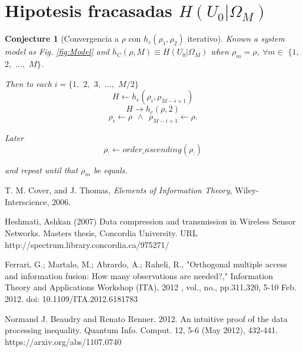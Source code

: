 \documentclass[a4paper,10pt]{article}
\newtheorem{conjecture}[mytheorem]{Conjecture}
\begin{document}
\section{Hipotesis fracasadas $H(U_0|\Omega_M)$ }
\label{subsec:h0OmegaM_2}


\begin{mdframed}[style=MDFStyGrayScreen]
\begin{conjecture}[Convergencia a $\rho$ con $h_c(\rho_1,\rho_2)$ iterativo]
 \label{lemm:h0OmegaM_hc2}
 Known a system model as Fig. \ref{fig:Model} and $h_{C}(\rho,M)\equiv H(U_0|\Omega_M)$ 
 when $\rho_m=\rho$, $\forall m \in $ $\{1,$ $2,$ $\dots,$ $M\}$.
 
 Then to each $i=\{1,$ $2,$ $3,$ $\dots,$ $M/2\}$
\begin{equation}\label{eq:HconjectureHc2_1}
H \leftarrow h_c(\rho_{i},\rho_{M-i+1})
\end{equation}
\begin{equation}\label{eq:HconjectureHc2_2}
H \rightarrow h_c(\rho,2)
\end{equation}
\begin{equation}\label{eq:HconjectureHc2_3}
\rho_{i} \leftarrow \rho ~~\wedge~~ \rho_{M-i+1} \leftarrow \rho .
\end{equation}

Later
\begin{equation}\label{eq:HconjectureHc2_3}
\rho_{:} \leftarrow order\_ascending(\rho_{:})
\end{equation}

and repeat until that $\rho_m$ be equals.
\end{conjecture}
\end{mdframed}




\begin{thebibliography}{99}
T. M. Cover, and J. Thomas, \textit{Elements of Information Theory}, Wiley-Interscience, 2006.

Heshmati, Ashkan   (2007) Data compression and transmission in Wireless Sensor Networks.  
Masters thesis, Concordia University. URL http://spectrum.library.concordia.ca/975271/ 
  
Ferrari, G.; Martalo, M.; Abrardo, A.; Raheli, R., "Orthogonal multiple 
access and information fusion: How many observations are needed?," 
Information Theory and Applications Workshop (ITA), 2012 , vol., no., 
pp.311,320, 5-10 Feb. 2012. doi: 10.1109/ITA.2012.6181783
  
Normand J. Beaudry and Renato Renner. 2012. An intuitive proof of the data processing inequality. 
Quantum Info. Comput. 12, 5-6 (May 2012), 432-441. https://arxiv.org/abs/1107.0740

\end{thebibliography}
\end{document}
